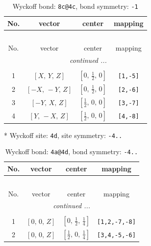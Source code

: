 \documentclass[fleqn,8pt]{jsarticle}
\begin{document}
\begin{longtable}{cccc}
\caption{Wyckoff bond: {\tt 8c@4c}, bond symmetry: {\tt -1}}
 \\
 \hline \hline
No. & vector & center & mapping \\ \hline \endfirsthead

\multicolumn{3}{l}{\tablename\ \thetable{}} \\
 \hline \hline
No. & vector & center & mapping \\ \hline \endhead

 \hline \hline
\multicolumn{3}{r}{\footnotesize\it continued ...} \\ \endfoot

 \hline \hline
\multicolumn{3}{r}{} \\ \endlastfoot

1 & $\left[ X,\, Y,\, Z \right]$ & $\left[ 0,\, \frac{1}{2},\, 0 \right]$ & {\tt [1,-5]} \\ \hline
2 & $\left[ - X,\, - Y,\, Z \right]$ & $\left[ 0,\, \frac{1}{2},\, 0 \right]$ & {\tt [2,-6]} \\ \hline
3 & $\left[ - Y,\, X,\, Z \right]$ & $\left[ \frac{1}{2},\, 0,\, 0 \right]$ & {\tt [3,-7]} \\ \hline
4 & $\left[ Y,\, - X,\, Z \right]$ & $\left[ \frac{1}{2},\, 0,\, 0 \right]$ & {\tt [4,-8]} \\
\end{longtable}
* Wyckoff site: {\tt 4d}, site symmetry: {\tt -4..}
\renewcommand{\arraystretch}{1.2}
\begin{longtable}{cccc}
\caption{Wyckoff bond: {\tt 4a@4d}, bond symmetry: {\tt -4..}}
 \\
 \hline \hline
No. & vector & center & mapping \\ \hline \endfirsthead

\multicolumn{3}{l}{\tablename\ \thetable{}} \\
 \hline \hline
No. & vector & center & mapping \\ \hline \endhead

 \hline \hline
\multicolumn{3}{r}{\footnotesize\it continued ...} \\ \endfoot

 \hline \hline
\multicolumn{3}{r}{} \\ \endlastfoot

1 & $\left[ 0,\, 0,\, Z \right]$ & $\left[ 0,\, \frac{1}{2},\, \frac{1}{4} \right]$ & {\tt [1,2,-7,-8]} \\ \hline
2 & $\left[ 0,\, 0,\, Z \right]$ & $\left[ \frac{1}{2},\, 0,\, \frac{1}{4} \right]$ & {\tt [3,4,-5,-6]} \\
\end{longtable}
\end{document}
